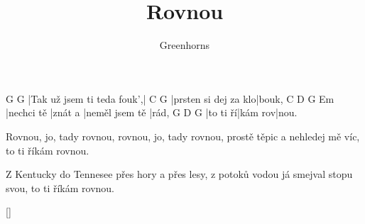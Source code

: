 \documentclass{song}
\title{Rovnou}
\author{Greenhorns}
\begin{document}
\strophe
G                          G\7
|Tak už jsem ti teda fouk',|
C                    G
|prsten si dej za klo|bouk,
C          D       G              Em
|nechci tě |znát a |neměl jsem tě |rád,
G        D\7     G
|to ti ří|kám rov|nou.
\endstrophe

Rovnou, jo, tady rovnou,
rovnou, jo, tady rovnou,
prostě těpic a nehledej mě víc,
to ti říkám rovnou.
\endstrophe

\strophe*
Z Kentucky do Tennesee
přes hory a přes lesy,
z potoků vodou já smejval stopu svou,
to ti říkám rovnou.
\endstrophe

\ref{}
\end{document}

